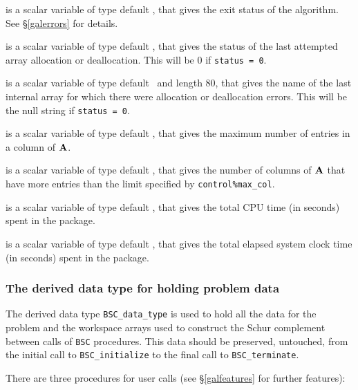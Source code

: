 \documentclass{galahad}
\newcommand{\packagename}{BSC}
\begin{document}
\begin{description}

 is a scalar variable of type default \integer, that gives the
exit status of the algorithm.
See \S\ref{galerrors}
for details.

 is a scalar variable of type default \integer, that gives
the status of the last attempted array allocation or deallocation.
This will be 0 if {\tt status = 0}.

 is a scalar variable of type default \character\
and length 80, that  gives the name of the last internal array
for which there were allocation or deallocation errors.
This will be the null string if {\tt status = 0}.

 is a scalar variable of type default \integer, that gives
 the maximum number of entries in a column of ${\mathbf{A}}$.

 is a scalar variable of type default \integer, that
 gives the number of columns of ${\mathbf{A}}$ that have more entries than the limit
 specified by {\tt control\%max\_col}.

 is a scalar variable of type default \realdp, that gives
 the total CPU time (in seconds) spent in the package.

 is a scalar variable of type default \realdp, that gives
 the total elapsed system clock time (in seconds) spent in the package.

\end{description}


\subsubsection{The derived data type for holding problem data}\label{typedata}
The derived data type
{\tt \packagename\_data\_type}
is used to hold all the data for the problem and the workspace arrays
used to construct the Schur complement between calls of
{\tt \packagename} procedures.
This data should be preserved, untouched, from the initial call to
{\tt \packagename\_initialize}
to the final call to
{\tt \packagename\_terminate}.


\galarguments
There are three procedures for user calls
(see \S\ref{galfeatures} for further features):
\end{document}
